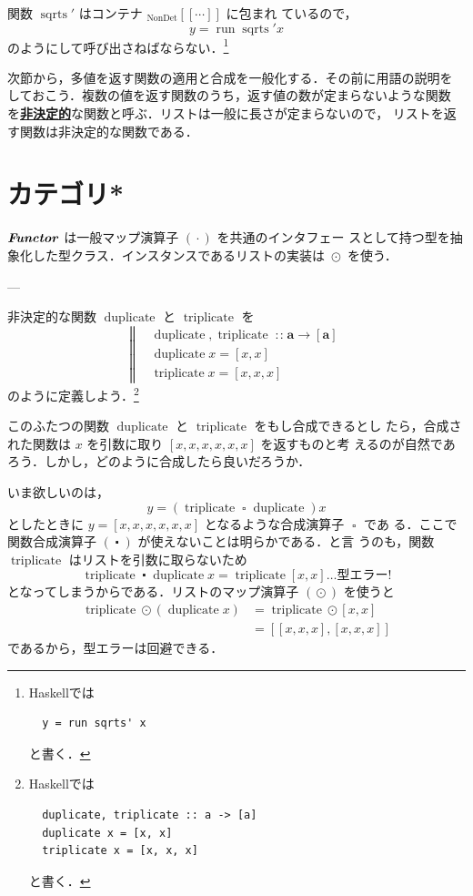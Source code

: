 \documentclass[a5paper,twoside,fleqn,draft]{jsbook}
\newcommand{\TK}[1]{\mask{\textbf{TK:}~#1}{C}}
\def\[{[\![}
\def\]{]\!]}
\newcommand{\programminglanguage}[1]{\textsf{#1}}
\newcommand{\haskell}{\programminglanguage{Haskell}}
\newcommand{\keyword}[1]{{\underline{\textbf{#1}}}}
\newcommand{\mBrace}{\Vert}
\newcommand{\mSpecialFunc}[1]{\mathrm{#1}}
\DeclareMathOperator{\mDuplicate}{\mSpecialFunc{duplicate}}
\DeclareMathOperator{\mRun}{\mSpecialFunc{run}}
\DeclareMathOperator{\mSqrts}{\mSpecialFunc{sqrts}}
\DeclareMathOperator{\mTriplicate}{\mSpecialFunc{triplicate}}
\DeclareMathOperator{\mCompFunc}{\centerdot}
\DeclareMathOperator{\mFuncArrow}{\rightarrow}
\DeclareMathOperator{\mIn}{{:\!:}}
\DeclareMathOperator{\mMap}{\cdot}
\DeclareMathOperator{\mMapList}{\odot}
\DeclareMathOperator{\mSomeOp}{\square}
\newcommand{\mType}[1]{\mathbf{#1}} %
\newcommand{\mA}{\mType{a}}
\newcommand{\mValueConstructor}[1]{\mathrm{#1}}
\newcommand{\mValueWith}[2]{{}_\mValueConstructor{#1}\[#2\]}
\newcommand{\mTypeClass}[1]{\textbf{\textit{#1}}}
\newcommand{\mFunctorTypeClass}{\mTypeClass{Functor}}
\begin{document}
関数 $\mSqrts'$ はコンテナ $\mValueWith{NonDet}{\dotsb}$ に包まれ
ているので，
\begin{equation}
  y=\mRun\mSqrts'x
\end{equation}
のようにして呼び出さねばならない．\footnote{\haskell では
\begin{verbatim}
  y = run sqrts' x
\end{verbatim}
と書く．}

次節から，多値を返す関数の適用と合成を一般化する．その前に用語の説明を
しておこう．複数の値を返す関数のうち，返す値の数が定まらないような関数
を\keyword{非決定的}な関数と呼ぶ．リストは一般に長さが定まらないので，
リストを返す関数は非決定的な関数である．


\section{カテゴリ*}

\TK{Writing.}

$\mFunctorTypeClass$ は一般マップ演算子 $(\mMap)$ を共通のインタフェー
スとして持つ型を抽象化した型クラス．インスタンスであるリストの実装は
$\mMapList$ を使う．

---

非決定的な関数 $\mDuplicate$ と $\mTriplicate$ を
\begin{equation}
  \left\mBrace
  \begin{aligned}
    &\mDuplicate,\mTriplicate
    \mIn\mA\mFuncArrow[\mA]\\
    &\mDuplicate x
    =[x,x]\\
    &\mTriplicate x
    =[x,x,x]
  \end{aligned}
  \right.
\end{equation}
のように定義しよう．\footnote{\haskell では
\begin{verbatim}
  duplicate, triplicate :: a -> [a]
  duplicate x = [x, x]
  triplicate x = [x, x, x]
\end{verbatim}
と書く．}

このふたつの関数 $\mDuplicate$ と $\mTriplicate$ をもし合成できるとし
たら，合成された関数は $x$ を引数に取り $[x,x,x,x,x,x]$ を返すものと考
えるのが自然であろう．しかし，どのように合成したら良いだろうか．

いま欲しいのは，
\begin{equation}
  y
  =(\mTriplicate\mSomeOp\mDuplicate)x
\end{equation}
としたときに $y=[x,x,x,x,x,x]$ となるような合成演算子 $\mSomeOp$ であ
る．ここで関数合成演算子 $(\mCompFunc)$ が使えないことは明らかである．と言
うのも，関数 $\mTriplicate$ はリストを引数に取らないため
\begin{equation}
  \mTriplicate\mCompFunc\mDuplicate x
  =\mTriplicate[x,x]
  \dots\text{型エラー!}
\end{equation}
となってしまうからである．リストのマップ演算子 $(\mMapList)$ を使うと
\begin{align}
  \mTriplicate\mMapList{}(\mDuplicate x)
  &=\mTriplicate\mMapList{}[x,x]\\
  &=[[x,x,x],[x,x,x]]
\end{align}
であるから，型エラーは回避できる．
\end{document}
